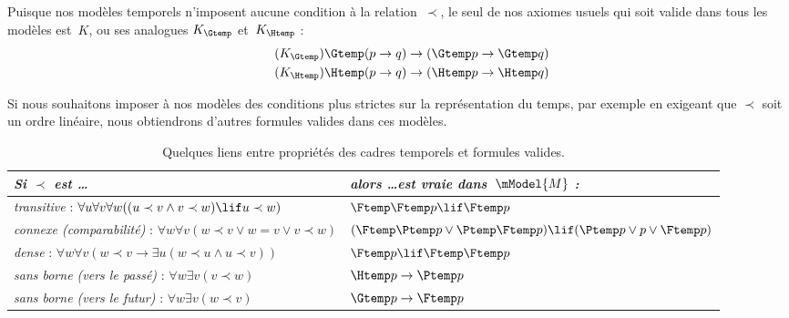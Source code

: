 \documentclass[../../../include/open-logic-section]{subfiles}
\begin{document}


Puisque nos modèles temporels n'imposent aucune condition à la
relation~$\prec$, le seul de nos axiomes usuels qui soit valide dans
tous les modèles est~$K$, ou ses analogues $K_{\Gtemp}$ et~$K_{\Htemp}$ :
\begin{align*}
\tag{$K_{\Gtemp}$}  \Gtemp (p \to q) & \to (\Gtemp p \to \Gtemp q)\\
\tag{$K_{\Htemp}$}  \Htemp (p \to q) & \to (\Htemp p \to \Htemp q)
\end{align*}

Si nous souhaitons imposer à nos modèles des conditions plus strictes
sur la représentation du temps, par exemple en exigeant que $\prec$
soit un ordre linéaire, nous obtiendrons d'autres formules valides
dans ces modèles.

\begin{table}[t]
  \begin{tabular}{| p{} || p{} |}
    \hline
    {\emph{Si $\prec$ est \dots}} & {\emph{alors \dots est vraie dans~$\mModel{M}$ :}} \\
    \hline \hline
    \emph{transitive} : \newline
    $\forall u \forall v \forall w ((u \prec v \land v \prec w) \lif u \prec w)$ &
    $\Ftemp \Ftemp p \lif \Ftemp p$  \\
    \hline
    \emph{connexe (comparabilité)} : \newline
    $\forall w \forall v (w \prec v \lor w = v \lor v \prec w)$ &
    $(\Ftemp \Ptemp  p \lor \Ptemp \Ftemp p) \lif (\Ptemp p \lor p \lor \Ftemp p)$\\
    \hline
    \emph{dense} : \newline
    $\forall w \forall v (w \prec v \to \exists u(w \prec u \land u \prec v))$ &
    $\Ftemp p \lif \Ftemp \Ftemp p$ \\
    \hline
    \emph{sans borne (vers le passé)} : \newline
    $\forall w \exists v( v \prec w)$ &
    $\Htemp p \to \Ptemp p$ \\
    \hline
    \emph{sans borne (vers le futur)} : \newline
    $\forall w \exists v( w \prec v)$ &
    $\Gtemp p \to \Ftemp p$ \\
    \hline
  \end{tabular}
  \caption{Quelques liens entre propriétés des cadres temporels et formules valides.}
\end{table}
\end{document}
